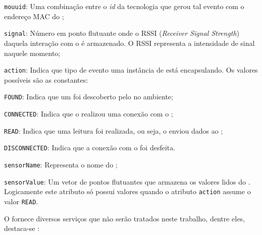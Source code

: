 \begin{alineas}
	\item \texttt{mouuid}: Uma combinação entre o \textit{id} da tecnologia que gerou tal evento com o endereço MAC do \smartobj;

	\item \texttt{signal}: Número em ponto flutuante onde o RSSI (\textit{Receiver Signal Strength}) daquela interação com o \smartobj é armazenado. O RSSI representa a intensidade de sinal naquele momento;

	\item \texttt{action}: Indica que tipo de evento uma instância de \sensordata está encapsulando. Os valores possíveis são as constantes:

	\begin{alineas}

		\item \texttt{FOUND}: Indica que um \smartobj foi descoberto pelo \mhub no ambiente;

		\item \texttt{CONNECTED}: Indica que o \mhub realizou uma conexão com o \smartobj;

		\item \texttt{READ}: Indica que uma leitura foi realizada, ou seja, o \smartobj enviou dados ao \mhub;

		\item \texttt{DISCONNECTED}: Indica que a conexão com o \smartobj foi desfeita.

	\end{alineas}

	\item \texttt{sensorName}: Representa o nome do \smartobj;

	\item \texttt{sensorValue}: Um vetor de pontos flutuantes que armazena os valores lidos do \smartobj. Logicamente este atributo só possui valores quando o atributo \texttt{action} assume o valor \texttt{READ}.
\end{alineas}

O \mhub fornece diversos serviços que não serão tratados neste trabalho, dentre eles, destaca-se \cite{gomes:2017}:

